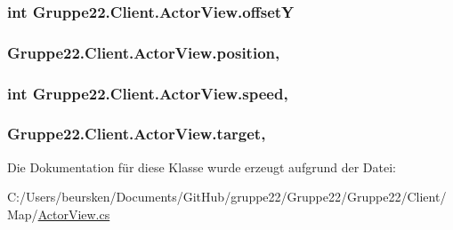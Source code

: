 \hypertarget{class_gruppe22_1_1_client_1_1_actor_view_a9a4c4ec1dc5769d84653c1d41c4cf4dd}{
\subsubsection[{offset\-Y}]{\setlength{\rightskip}{0pt plus 5cm}int Gruppe22.\-Client.\-Actor\-View.\-offset\-Y\hspace{0.3cm}{\ttfamily [get]}}}\label{class_gruppe22_1_1_client_1_1_actor_view_a9a4c4ec1dc5769d84653c1d41c4cf4dd}
\hypertarget{class_gruppe22_1_1_client_1_1_actor_view_a5a4e1de85966801e99c5fb08f7d342ca}{
\subsubsection[{position}]{ Gruppe22.\-Client.\-Actor\-View.\-position\hspace{0.3cm}{\ttfamily [get]}, {\ttfamily [set]}}}\label{class_gruppe22_1_1_client_1_1_actor_view_a5a4e1de85966801e99c5fb08f7d342ca}
\hypertarget{class_gruppe22_1_1_client_1_1_actor_view_a3c41306652c4ca9d9ab01b32445ce7da}{
\subsubsection[{speed}]{\setlength{\rightskip}{0pt plus 5cm}int Gruppe22.\-Client.\-Actor\-View.\-speed\hspace{0.3cm}{\ttfamily [get]}, {\ttfamily [set]}}}\label{class_gruppe22_1_1_client_1_1_actor_view_a3c41306652c4ca9d9ab01b32445ce7da}
\hypertarget{class_gruppe22_1_1_client_1_1_actor_view_a0797749459b19b816824f63199eb3345}{
\subsubsection[{target}]{ Gruppe22.\-Client.\-Actor\-View.\-target\hspace{0.3cm}{\ttfamily [get]}, {\ttfamily [set]}}}\label{class_gruppe22_1_1_client_1_1_actor_view_a0797749459b19b816824f63199eb3345}


Die Dokumentation für diese Klasse wurde erzeugt aufgrund der Datei\-:\begin{DoxyCompactItemize}
\item 
C\-:/\-Users/beursken/\-Documents/\-Git\-Hub/gruppe22/\-Gruppe22/\-Gruppe22/\-Client/\-Map/\hyperlink{_actor_view_8cs}{Actor\-View.\-cs}\end{DoxyCompactItemize}
